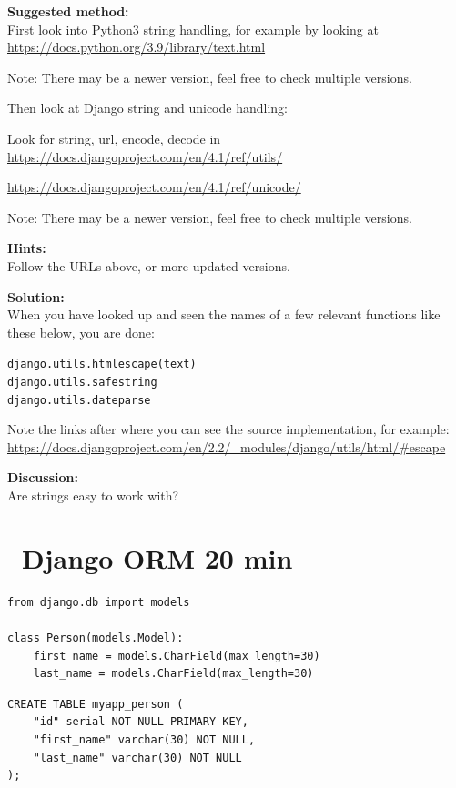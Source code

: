 \documentclass[a4paper,11pt,notitlepage]{report}
\begin{document}
{\bf Suggested method:}\\
First look into Python3 string handling, for example by looking at\\
\url{https://docs.python.org/3.9/library/text.html}

Note: There may be a newer version, feel free to check multiple versions.

Then look at Django string and unicode handling:
\begin{list2}
\item Look for string, url, encode, decode in\\
\url{https://docs.djangoproject.com/en/4.1/ref/utils/}
\item \url{https://docs.djangoproject.com/en/4.1/ref/unicode/}
\end{list2}

Note: There may be a newer version, feel free to check multiple versions.

{\bf Hints:}\\
Follow the URLs above, or more updated versions.

{\bf Solution:}\\
When you have looked up and seen the names of a few relevant functions like these below, you are done:

\begin{alltt}
django.utils.html escape(text)
django.utils.safestring
django.utils.dateparse
\end{alltt}

Note the links after where you can see the source implementation, for example:\\
\url{https://docs.djangoproject.com/en/2.2/_modules/django/utils/html/#escape}


{\bf Discussion:}\\
Are strings easy to work with?


\chapter{\faExclamationTriangle\ Django ORM 20 min}
\label{ex:django-orm}

\begin{verbatim}
from django.db import models

class Person(models.Model):
    first_name = models.CharField(max_length=30)
    last_name = models.CharField(max_length=30)
\end{verbatim}

\begin{verbatim}
CREATE TABLE myapp_person (
    "id" serial NOT NULL PRIMARY KEY,
    "first_name" varchar(30) NOT NULL,
    "last_name" varchar(30) NOT NULL
);
\end{verbatim}
\end{document}
